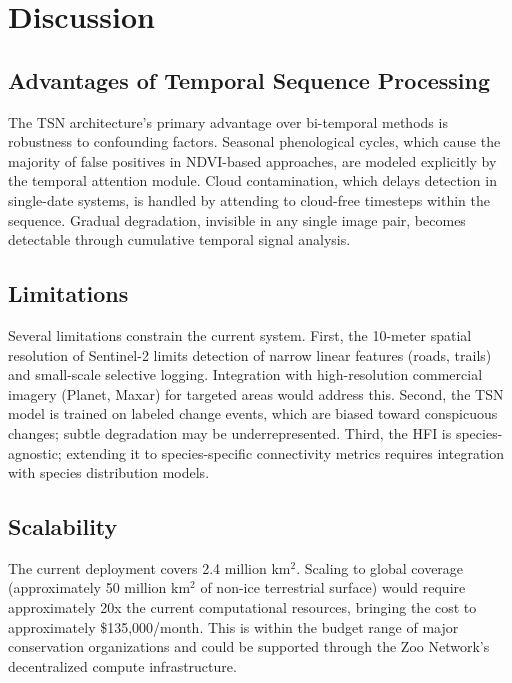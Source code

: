 \section{Discussion}

\label{sec:discussion}

\subsection{Advantages of Temporal Sequence Processing}

The TSN architecture's primary advantage over bi-temporal methods is robustness to confounding factors.
Seasonal phenological cycles, which cause the majority of false positives in NDVI-based approaches, are modeled explicitly by the temporal attention module.
Cloud contamination, which delays detection in single-date systems, is handled by attending to cloud-free timesteps within the sequence.
Gradual degradation, invisible in any single image pair, becomes detectable through cumulative temporal signal analysis.

\subsection{Limitations}

Several limitations constrain the current system.
First, the 10-meter spatial resolution of Sentinel-2 limits detection of narrow linear features (roads, trails) and small-scale selective logging.
Integration with high-resolution commercial imagery (Planet, Maxar) for targeted areas would address this.
Second, the TSN model is trained on labeled change events, which are biased toward conspicuous changes; subtle degradation may be underrepresented.
Third, the HFI is species-agnostic; extending it to species-specific connectivity metrics requires integration with species distribution models.

\subsection{Scalability}

The current deployment covers 2.4 million km$^2$.
Scaling to global coverage (approximately 50 million km$^2$ of non-ice terrestrial surface) would require approximately 20x the current computational resources, bringing the cost to approximately \$135,000/month.
This is within the budget range of major conservation organizations and could be supported through the Zoo Network's decentralized compute infrastructure.

